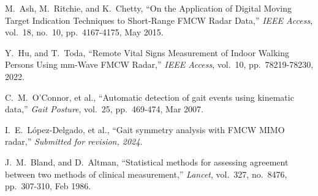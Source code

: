  M.~Ash, M.~Ritchie, and K.~Chetty, ``On the Application of Digital Moving Target Indication Techniques to Short-Range FMCW Radar Data,'' \emph{IEEE Access}, vol.~18, no.~10, pp.~4167-4175, May 2015.

 Y.~Hu, and T.~Toda, ``Remote Vital Signs Measurement of Indoor Walking Persons Using mm-Wave FMCW Radar,'' \emph{IEEE Access}, vol.~10, pp.~78219-78230, 2022.

 C.~M.~O’Connor, et al., ``Automatic detection of gait events using kinematic data,'' \emph{Gait Posture}, vol.~25, pp.~469-474, Mar 2007.

 I.~E.~López-Delgado, et al., ``Gait symmetry analysis with FMCW MIMO radar,'' \emph{Submitted for revision, 2024}.

 J.~M.~Bland, and D.~Altman, ``Statistical methods for assessing agreement between two methods of clinical measurement,'' \emph{Lancet}, vol.~327, no.~8476, pp.~307-310, Feb 1986.
